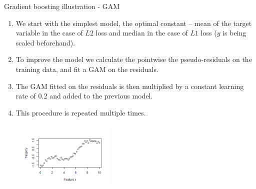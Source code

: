\begin{vbframe}{Gradient boosting illustration - GAM}
\framebreak
\begin{enumerate}

  \item
    We start with the simplest model, the optimal constant -- mean of the target variable in the case of $L2$ loss and median in the case of $L1$ loss ($y$ is being scaled beforehand).

  \item
    To improve the model we calculate the pointwise the pseudo-residuals on the training data, and fit a GAM on the residuals.

  \item
    The GAM fitted on the residuals is then multiplied by a constant learning rate of $0.2$ and added to the previous model.

  \item
    This procedure is repeated multiple times.

\end{enumerate}

\vspace{-0.3cm}
\begin{figure}
  \includegraphics[width=0.4\textwidth]{figure_man/illustration_data_normal_scaled.png}
\end{figure}


\end{vbframe}

